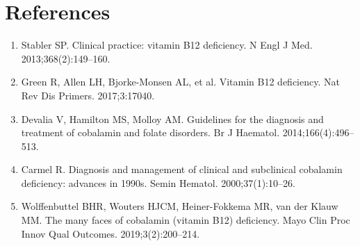 \section*{References}
\begin{enumerate}
  \item Stabler SP. Clinical practice: vitamin B12 deficiency. N Engl J Med. 2013;368(2):149--160.
  \item Green R, Allen LH, Bjorke-Monsen AL, et al. Vitamin B12 deficiency. Nat Rev Dis Primers. 2017;3:17040.
  \item Devalia V, Hamilton MS, Molloy AM. Guidelines for the diagnosis and treatment of cobalamin and folate disorders. Br J Haematol. 2014;166(4):496--513.
  \item Carmel R. Diagnosis and management of clinical and subclinical cobalamin deficiency: advances in 1990s. Semin Hematol. 2000;37(1):10--26.
  \item Wolffenbuttel BHR, Wouters HJCM, Heiner-Fokkema MR, van der Klauw MM. The many faces of cobalamin (vitamin B12) deficiency. Mayo Clin Proc Innov Qual Outcomes. 2019;3(2):200--214.
\end{enumerate}

\clearpage

